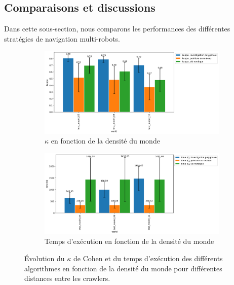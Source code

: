 \documentclass[english,RandD]{rapportPFE}  %
\begin{document}
		\subsection*{Comparaisons et discussions}
			Dans cette sous-section, nous comparons les performances des différentes stratégies de navigation multi-robots.

			\begin{figure}[h!]
				\begin{subfigure}[t]{0.9\linewidth}
					\includegraphics[width=\linewidth]{graphics/investigation_polygonale-peinture_au_rouleau_ski_nordique-kappa_for_each_world_vs_investigation_polygonale-kappa_for_each_world.png}
					\caption{$\kappa$ en fonction de la densité du monde}
					\label{fig:investigation_polygonale-peinture_au_rouleau_ski_nordique-kappa_for_each_world_vs_investigation_polygonale-kappa_for_each_d}
				\end{subfigure}
				\hfill
				\begin{subfigure}[t]{0.9\linewidth}
						\includegraphics[width=\linewidth]{graphics/investigation_polygonale-peinture_au_rouleau_ski_nordique-time_for_each_world_vs_investigation_polygonale-time_for_each_world.png}
						\caption{Temps d'exécution en fonction de la densité du monde}
						\label{fig:investigation_polygonale-peinture_au_rouleau_ski_nordique-time_for_each_world_vs_investigation_polygonale-time_for_each_d}
				\end{subfigure}
				\caption{Évolution du $\kappa$ de Cohen et du temps d'exécution des différents algorithmes en fonction de la densité du monde pour différentes distances entre les crawlers.}
				\label{fig:investigation_polygonale-peinture_au_rouleau_ski_nordique_for_each_world}
			\end{figure}
\end{document}

